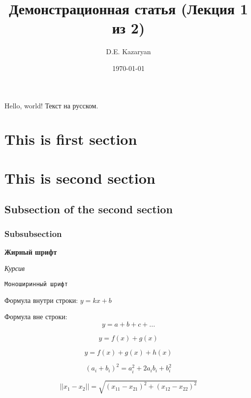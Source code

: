 \documentclass[a4paper,12pt]{article}
\title{Демонстрационная статья (Лекция 1 из 2)}
\date{\today}
\author{D.E. Kazaryan}
\begin{document}
\maketitle


Hello, world! Текст на русском.

\section{This is first section}

\section{This is second section}

\subsection{Subsection of the second section}

\subsubsection{Subsubsection}

\textbf{Жирный шрифт}

\textit{Курсив}

\texttt{Моноширинный шрифт}

Формула внутри строки: $y=kx+b$

Формула вне строки: $$y=a+b+c+...$$

\begin{equation}
    y = f(x) + g(x)
\end{equation}

\begin{equation*}
    y = f(x) + g(x) + h(x)
\end{equation*}

\begin{equation}
    (a_i+b_i)^2 = a_i^2 + 2 a_i b_i + b_i^2
\end{equation}

\begin{equation}
    ||x_1 - x_2|| = \sqrt{(x_{11} - x_{21})^2 + (x_{12} - x_{22})^2}
\end{equation}
\end{document}
